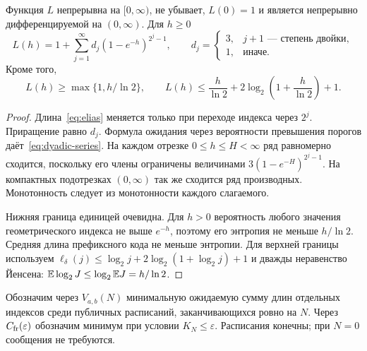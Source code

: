 \begin{lemma}
\label{lem:length}
Функция $L$ непрерывна на $[0,\infty)$, не убывает, $L(0)=1$ и является
непрерывно дифференцируемой на $(0,\infty)$. Для $h\ge0$
\begin{equation}
 L(h)=1+\sum_{j=1}^{\infty}d_j(1-e^{-h})^{2^j-1},\qquad
 d_j=\begin{cases}3,&j+1\text{ --- степень двойки},\\1,&\text{иначе}.
 \end{cases}
 \label{eq:dyadic-series}
\end{equation}
Кроме того,
\begin{equation}
 L(h)\ge\max\{1,h/\ln2\},\qquad
 L(h)\le\frac{h}{\ln2}
      +2\log_2\left(1+\frac{h}{\ln2}\right)+1.
 \label{eq:L-bounds}
\end{equation}
\end{lemma}
\begin{proof}
Длина~\eqref{eq:elias} меняется только при переходе индекса через $2^j$.
Приращение равно $d_j$. Формула ожидания через вероятности превышения порогов
даёт~\eqref{eq:dyadic-series}. На каждом отрезке $0\le h\le H<\infty$ ряд
равномерно сходится, поскольку его члены ограничены величинами
$3(1-e^{-H})^{2^j-1}$. На компактных подотрезках $(0,\infty)$ так же сходится
ряд производных. Монотонность следует из монотонности каждого слагаемого.

Нижняя граница единицей очевидна. Для $h>0$ вероятность любого значения
геометрического индекса не выше $e^{-h}$, поэтому его энтропия не меньше
$h/\ln2$. Средняя длина префиксного кода не меньше энтропии. Для верхней
границы используем
$\ell_\delta(j)\le\log_2j+2\log_2(1+\log_2j)+1$ и дважды неравенство Йенсена:
$\mathbb E\log_2J\le\log_2\mathbb E J=h/\ln2$.
\end{proof}

Обозначим через $V_{a,b}(N)$ минимальную ожидаемую сумму длин отдельных индексов
среди публичных расписаний, заканчивающихся ровно на $N$. Через
$C_{\rm fr}(\varepsilon)$ обозначим минимум при условии
$K_N\le\varepsilon$. Расписания конечны; при $N=0$ сообщения не требуются.

